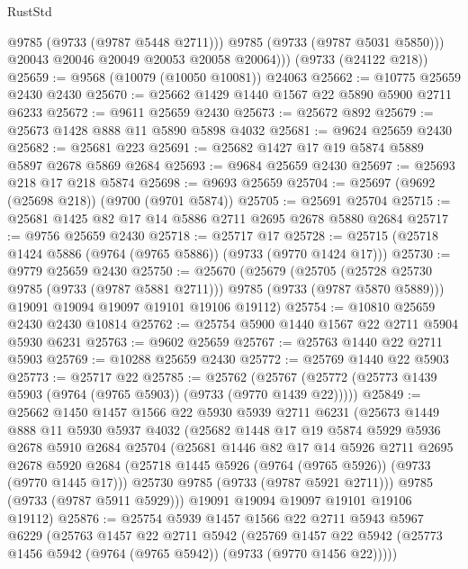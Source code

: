 \begin{lexlean}{RustStd}
\begin{coremodule}
              @9785
              (@9733 (@9787 @5448 @2711)))
            @9785
            (@9733 (@9787 @5031 @5850)))
          @20043
          @20046
          @20049
          @20053
          @20058
          @20064)))
    (@9733 (@24122 @218))
@25659 := @9568 (@10079 (@10050 @10081)) @24063
@25662 := @10775 @25659 @2430 @2430
@25670 := @25662 @1429 @1440 @1567 @22 @5890 @5900 @2711 @6233
@25672 := @9611 @25659 @2430
@25673 := @25672 @892
@25679 := @25673 @1428 @888 @11 @5890 @5898 @4032
@25681 := @9624 @25659 @2430
@25682 := @25681 @223
@25691 := @25682 @1427 @17 @19 @5874 @5889 @5897 @2678 @5869 @2684
@25693 := @9684 @25659 @2430
@25697 := @25693 @218 @17 @218 @5874
@25698 := @9693 @25659
@25704 := @25697 (@9692 (@25698 @218)) (@9700 (@9701 @5874))
@25705 := @25691 @25704
@25715 := @25681 @1425 @82 @17 @14 @5886 @2711 @2695 @2678 @5880 @2684
@25717 := @9756 @25659 @2430
@25718 := @25717 @17
@25728 := @25715 (@25718 @1424 @5886 (@9764 (@9765 @5886)) (@9733 (@9770 @1424 @17)))
@25730 := @9779 @25659 @2430
@25750 := @25670
    (@25679
      (@25705 (@25728 @25730 @9785 (@9733 (@9787 @5881 @2711))) @9785 (@9733 (@9787 @5870 @5889)))
      @19091
      @19094
      @19097
      @19101
      @19106
      @19112)
@25754 := @10810 @25659 @2430 @2430 @10814
@25762 := @25754 @5900 @1440 @1567 @22 @2711 @5904 @5930 @6231
@25763 := @9602 @25659
@25767 := @25763 @1440 @22 @2711 @5903
@25769 := @10288 @25659 @2430
@25772 := @25769 @1440 @22 @5903
@25773 := @25717 @22
@25785 := @25762
    (@25767 (@25772 (@25773 @1439 @5903 (@9764 (@9765 @5903)) (@9733 (@9770 @1439 @22)))))
@25849 := @25662
    @1450
    @1457
    @1566
    @22
    @5930
    @5939
    @2711
    @6231
    (@25673
      @1449
      @888
      @11
      @5930
      @5937
      @4032
      (@25682
        @1448
        @17
        @19
        @5874
        @5929
        @5936
        @2678
        @5910
        @2684
        @25704
        (@25681
          @1446
          @82
          @17
          @14
          @5926
          @2711
          @2695
          @2678
          @5920
          @2684
          (@25718 @1445 @5926 (@9764 (@9765 @5926)) (@9733 (@9770 @1445 @17)))
          @25730
          @9785
          (@9733 (@9787 @5921 @2711)))
        @9785
        (@9733 (@9787 @5911 @5929)))
      @19091
      @19094
      @19097
      @19101
      @19106
      @19112)
@25876 := @25754
    @5939
    @1457
    @1566
    @22
    @2711
    @5943
    @5967
    @6229
    (@25763
      @1457
      @22
      @2711
      @5942
      (@25769 @1457 @22 @5942 (@25773 @1456 @5942 (@9764 (@9765 @5942)) (@9733 (@9770 @1456 @22)))))

\end{coremodule}
\end{lexlean}
